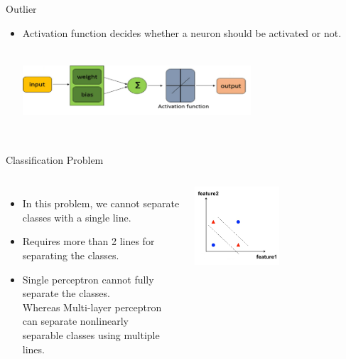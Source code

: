 \documentclass[aspectratio=169,13pt,usenames,dvipsnames]{beamer}
\begin{document}
\begin{frame}{Outlier}
\begin{itemize}
\item Activation function decides whether a neuron should be activated or not. \\
\centering
\includegraphics[width=8.5cm , height=3.7cm]{Images/AIML_MLP_IMG8.png}
\end{itemize}
\end{frame}

\begin{frame}{ Classification Problem }
\begin{columns}
\begin{itemize}
  \item In this problem, we cannot separate classes with a single line.
  \item Requires more than 2 lines for separating the classes.
  \item Single perceptron cannot fully separate the classes. \\
  Whereas Multi-layer perceptron can separate nonlinearly \\
  separable classes using multiple lines.
\end{itemize}
\includegraphics[width=0.5\textwidth, height=0.5\textheight]{Images/AIML_MLP_IMG9.png}
\end{columns}
\end{frame}
\end{document}
